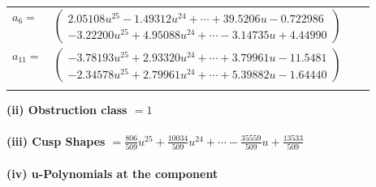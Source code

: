 \documentclass[1p]{elsarticle_modified}
\theoremstyle{definition}
\begin{document}
\begin{tabular}{m{7pt} m{180pt} m{7pt} m{180pt} }
\flushright $a_{6}=$&$\begin{pmatrix}2.05108 u^{25}-1.49312 u^{24}+\cdots+39.5206 u-0.722986\\-3.22200 u^{25}+4.95088 u^{24}+\cdots-3.14735 u+4.44990\end{pmatrix}$ \\
\flushright $a_{11}=$&$\begin{pmatrix}-3.78193 u^{25}+2.93320 u^{24}+\cdots+3.79961 u-11.5481\\-2.34578 u^{25}+2.79961 u^{24}+\cdots+5.39882 u-1.64440\end{pmatrix}$\\&\end{tabular}
\flushleft \textbf{(ii) Obstruction class $= 1$}\\~\\
\flushleft \textbf{(iii) Cusp Shapes $= \frac{806}{509} u^{25}+\frac{10034}{509} u^{24}+\cdots-\frac{35559}{509} u+\frac{13533}{509}$}\\~\\
\newpage\renewcommand{\arraystretch}{1}
\flushleft \textbf{(iv) u-Polynomials at the component}\newline \\
\end{document}

